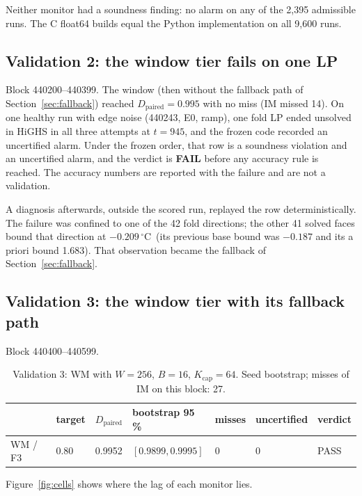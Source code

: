 \documentclass[11pt,a4paper]{article}
\newcommand{\degC}{\ensuremath{{}^\circ}C}
\newcommand{\Dp}{D_{\mathrm{paired}}}
\begin{document}
Neither monitor had a soundness finding: no alarm on any of the 2,395 admissible runs. The C float64 builds equal the
Python implementation on all 9,600 runs.

\subsection{Validation 2: the window tier fails on one LP}\label{sec:val2}

Block 440200--440399. The window (then without the fallback path of Section~\ref{sec:fallback}) reached $\Dp = 0.995$
with no miss (IM missed 14). On one healthy run with edge noise (440243, E0, ramp), one fold LP ended unsolved in HiGHS
in all three attempts at $t = 945$, and the frozen code recorded an uncertified alarm. Under the frozen order, that row
is a soundness violation and an uncertified alarm, and the verdict is \textbf{FAIL} before any accuracy rule is
reached. The accuracy numbers are reported with the failure and are not a validation.

A diagnosis afterwards, outside the scored run, replayed the row deterministically. The failure was confined to one of
the 42 fold directions; the other 41 solved faces bound that direction at $-0.209$\,\degC\ (its previous base bound
was $-0.187$ and its a priori bound 1.683). That observation became the fallback of Section~\ref{sec:fallback}.

\subsection{Validation 3: the window tier with its fallback path}\label{sec:val3}

Block 440400--440599.

\begin{table}[ht]
\centering\small
\caption{Validation 3: WM with $W = 256$, $B = 16$, $K_{\mathrm{cap}} = 64$. Seed bootstrap; misses of IM on this
block: 27.}\label{tab:val3}
\begin{tabular}{lllllll}
\toprule
 & target & $\Dp$ & bootstrap 95\,\% & misses & uncertified & verdict\\
\midrule
WM / F3 & 0.80 & 0.9952 & $[0.9899, 0.9995]$ & 0 & 0 & PASS\\
\bottomrule
\end{tabular}
\end{table}

Figure~\ref{fig:cells} shows where the lag of each monitor lies.
\end{document}
